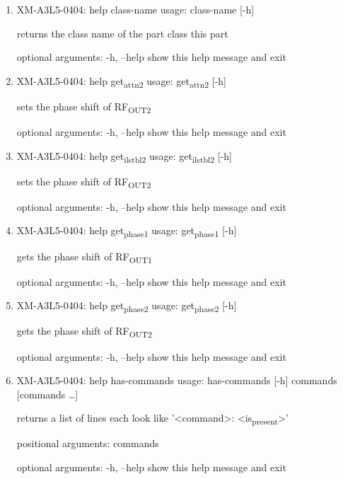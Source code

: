 \documentclass[11pt]{article}
\begin{document}
\begin{enumerate}
\item XM-A3L5-0404: help class-name
\label{sec:org0a7ae2e}
usage: class-name [-h]

returns the class name of the part class this part

optional arguments:
  -h, --help  show this help message and exit

\item XM-A3L5-0404: help get\textsubscript{attn}\textsubscript{2}
\label{sec:org7013014}
usage: get\textsubscript{attn}\textsubscript{2} [-h]

sets the phase shift of RF\textsubscript{OUT2}

optional arguments:
  -h, --help  show this help message and exit

\item XM-A3L5-0404: help get\textsubscript{il}\textsubscript{stbl}\textsubscript{2}
\label{sec:org942e16e}
usage: get\textsubscript{il}\textsubscript{stbl}\textsubscript{2} [-h]

sets the phase shift of RF\textsubscript{OUT2}

optional arguments:
  -h, --help  show this help message and exit

\item XM-A3L5-0404: help get\textsubscript{phase}\textsubscript{1}
\label{sec:org0f7c5ab}
usage: get\textsubscript{phase}\textsubscript{1} [-h]

gets the phase shift of RF\textsubscript{OUT1}

optional arguments:
  -h, --help  show this help message and exit

\item XM-A3L5-0404: help get\textsubscript{phase}\textsubscript{2}
\label{sec:org11a1b5f}
usage: get\textsubscript{phase}\textsubscript{2} [-h]

gets the phase shift of RF\textsubscript{OUT2}

optional arguments:
  -h, --help  show this help message and exit

\item XM-A3L5-0404: help has-commands
\label{sec:org70129b2}
usage: has-commands [-h] commands [commands \ldots{}]

returns a list of lines each look like '<command>: <is\textsubscript{present}>'

positional arguments:
  commands

optional arguments:
  -h, --help  show this help message and exit


\end{enumerate}
\end{document}
